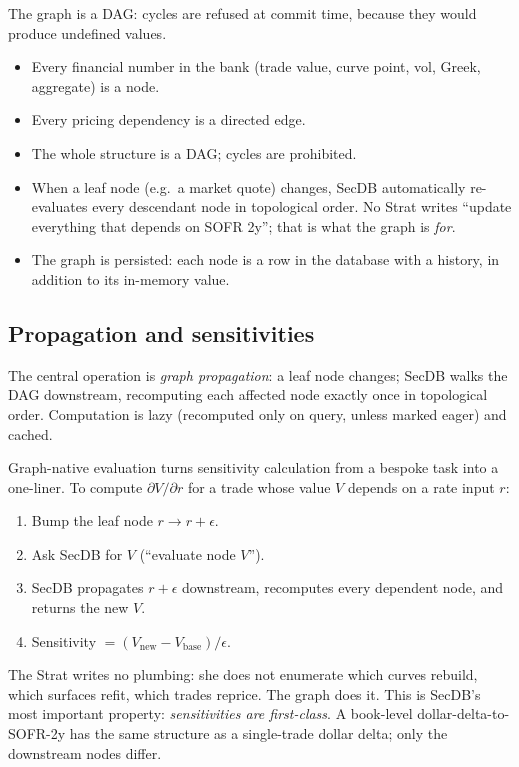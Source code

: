 The graph is a DAG: cycles are refused at commit time, because
they would produce undefined values.

\begin{keyfactbox}
\begin{itemize}
  \item Every financial number in the bank (trade value, curve
    point, vol, Greek, aggregate) is a node.
  \item Every pricing dependency is a directed edge.
  \item The whole structure is a DAG; cycles are prohibited.
  \item When a leaf node (e.g.\ a market quote) changes, SecDB
    automatically re-evaluates every descendant node in
    topological order.  No Strat writes ``update everything that
    depends on SOFR 2y''; that is what the graph is \emph{for}.
  \item The graph is persisted: each node is a row in the
    database with a history, in addition to its in-memory value.
\end{itemize}
\end{keyfactbox}

\subsection{Propagation and sensitivities}
\label{sec:secdb_prop}

The central operation is \emph{graph propagation}: a leaf node
changes; SecDB walks the DAG downstream, recomputing each affected
node exactly once in topological order.  Computation is lazy
(recomputed only on query, unless marked eager) and cached.

Graph-native evaluation turns sensitivity calculation from a
bespoke task into a one-liner.  To compute
$\partial V / \partial r$ for a trade whose value $V$ depends on a
rate input $r$:
\begin{enumerate}
  \item Bump the leaf node $r \to r + \epsilon$.
  \item Ask SecDB for $V$ (``evaluate node $V$'').
  \item SecDB propagates $r+\epsilon$ downstream, recomputes every
    dependent node, and returns the new $V$.
  \item Sensitivity $= (V_{\text{new}} - V_{\text{base}}) / \epsilon$.
\end{enumerate}
The Strat writes no plumbing: she does not enumerate which curves
rebuild, which surfaces refit, which trades reprice.  The graph
does it.  This is SecDB's most important property:
\emph{sensitivities are first-class}.  A book-level
dollar-delta-to-SOFR-2y has the same structure as a single-trade
dollar delta; only the downstream nodes differ.


